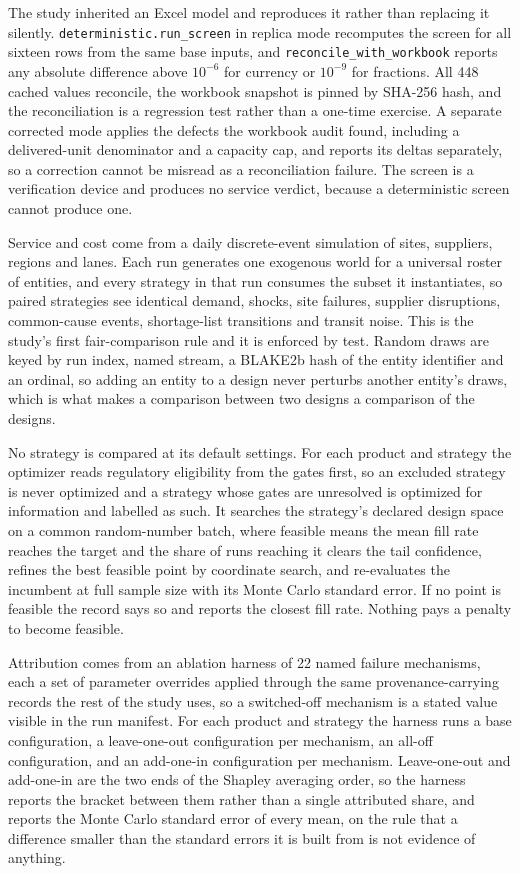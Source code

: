 The study inherited an Excel model and reproduces it rather than replacing it silently.
\texttt{deterministic.run\_screen} in replica mode recomputes the screen for all sixteen rows
from the same base inputs, and \texttt{reconcile\_with\_workbook} reports any absolute
difference above $10^{-6}$ for currency or $10^{-9}$ for fractions. All 448 cached values
reconcile, the workbook snapshot is pinned by SHA-256 hash, and the reconciliation is a
regression test rather than a one-time exercise. A separate corrected mode applies the defects
the workbook audit found, including a delivered-unit denominator and a capacity cap, and
reports its deltas separately, so a correction cannot be misread as a reconciliation failure.
The screen is a verification device and produces no service verdict, because a deterministic
screen cannot produce one.

Service and cost come from a daily discrete-event simulation of sites, suppliers, regions and
lanes. Each run generates one exogenous world for a universal roster of entities, and every
strategy in that run consumes the subset it instantiates, so paired strategies see identical
demand, shocks, site failures, supplier disruptions, common-cause events, shortage-list
transitions and transit noise. This is the study's first fair-comparison rule and it is enforced
by test. Random draws are keyed by run index, named stream, a BLAKE2b hash of the entity
identifier and an ordinal, so adding an entity to a design never perturbs another entity's
draws, which is what makes a comparison between two designs a comparison of the designs.

No strategy is compared at its default settings. For each product and strategy the optimizer
reads regulatory eligibility from the gates first, so an excluded strategy is never optimized
and a strategy whose gates are unresolved is optimized for information and labelled as such. It
searches the strategy's declared design space on a common random-number batch, where feasible
means the mean fill rate reaches the target and the share of runs reaching it clears the tail
confidence, refines the best feasible point by coordinate search, and re-evaluates the incumbent
at full sample size with its Monte Carlo standard error. If no point is feasible the record says
so and reports the closest fill rate. Nothing pays a penalty to become feasible.

Attribution comes from an ablation harness of 22 named failure mechanisms, each a set of
parameter overrides applied through the same provenance-carrying records the rest of the study
uses, so a switched-off mechanism is a stated value visible in the run manifest. For each
product and strategy the harness runs a base configuration, a leave-one-out configuration per
mechanism, an all-off configuration, and an add-one-in configuration per mechanism.
Leave-one-out and add-one-in are the two ends of the Shapley averaging order, so the harness
reports the bracket between them rather than a single attributed share, and reports the Monte
Carlo standard error of every mean, on the rule that a difference smaller than the standard
errors it is built from is not evidence of anything.

